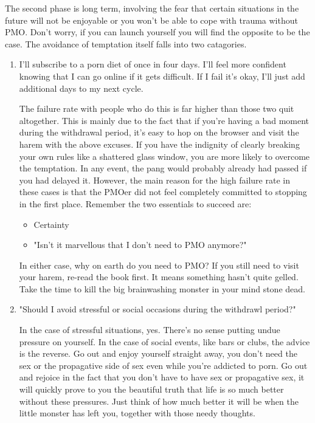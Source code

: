 \documentclass[easypeasy.tex]{subfiles}
\begin{document}
The second phase is long term, involving the fear that certain situations in the future will not be enjoyable or you won't be able to cope with trauma without PMO. Don't worry, if you can launch yourself you will find the opposite to be the case. The avoidance of temptation itself falls into two catagories.
  \begin{enumerate}
  \item I'll subscribe to a porn diet of once in four days. I'll feel more confident knowing that I can go online if it gets difficult. If I fail it's okay, I'll just add additional days to my next cycle.

The failure rate with people who do this is far higher than those two quit altogether. This is mainly due to the fact that if you're having a bad moment during the withdrawal period, it's easy to hop on the browser and visit the harem with the above excuses. If you have the indignity of clearly breaking your own rules like a shattered glass window, you are more likely to overcome the temptation. In any event, the pang would probably already had passed if you had delayed it. However, the main reason for the high failure rate in these cases is that the PMOer did not feel completely committed to stopping in the first place. Remember the two essentials to succeed are:
\begin{itemize}
  \item Certainty
  \item "Isn't it marvellous that I don't need to PMO anymore?"
\end{itemize}

In either case, why on earth do you need to PMO? If you still need to visit your harem, re-read the book first. It means something hasn't quite gelled. Take the time to kill the big brainwashing monster in your mind stone dead.

  \item "Should I avoid stressful or social occasions during the withdrawl period?" 

In the case of stressful situations, yes. There's no sense putting undue pressure on yourself. In the case of social events, like bars or clubs, the advice is the reverse. Go out and enjoy yourself straight away, you don't need the sex or the propagative side of sex even while you're addicted to porn. Go out and rejoice in the fact that you don't have to have sex or propagative sex, it will quickly prove to you the beautiful truth that life is so much better without these pressures. Just think of how much better it will be when the little monster has left you, together with those needy thoughts.
\end{enumerate}
\end{document}
